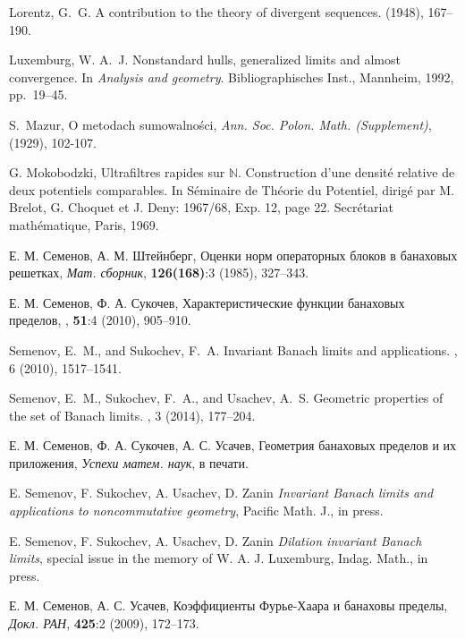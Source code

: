 \documentclass[12pt]{article}
\def\N{{\mathbb{N}}}
\begin{document}
\begin{thebibliography}{10}
{\sc Lorentz, G.~G.}
\newblock A contribution to the theory of divergent sequences.
 (1948), 167--190.

{\sc Luxemburg, W. A.~J.}
\newblock Nonstandard hulls, generalized limits and almost convergence.
\newblock In {\em Analysis and geometry}. Bibliographisches Inst., Mannheim,
  1992, pp.~19--45.

S.~Mazur,
\newblock O metodach sumowalno{\'{s}}ci,
\newblock \textit{Ann. Soc. Polon.
  Math. (Supplement)}, (1929), 102-107.

G. Mokobodzki, Ultrafiltres rapides sur $\N$. Construction d'une densit\'e relative de deux
potentiels comparables. In S\'eminaire de Th\'eorie du Potentiel, dirig\'e par M. Brelot, G.
Choquet et J. Deny: 1967/68, Exp. 12, page 22. Secr\'etariat math\'ematique, Paris, 1969.

{ Е. М. Семенов, А. М. Штейнберг},
{Оценки норм операторных блоков в банаховых решетках},
\newblock \textit{ Мат. сборник}, \textbf{126(168)}:3 (1985), 327--343.

{ Е. М. Семенов, Ф. А. Сукочев},
{ Характеристические функции банаховых пределов},
, \textbf{51}:4 (2010), 905--910.

{\sc Semenov, E.~M., and Sukochev, F.~A.}
\newblock Invariant {B}anach limits and applications.
, 6 (2010), 1517--1541.

{\sc Semenov, E.~M., Sukochev, F.~A., and Usachev, A.~S.}
\newblock Geometric properties of the set of {B}anach limits.
, 3 (2014), 177--204.

{ Е. М. Семенов, Ф. А. Сукочев, А. С. Усачев},
{Геометрия банаховых пределов и их приложения},
\newblock \textit{Успехи матем. наук}, в печати.

 E. Semenov, F. Sukochev, A. Usachev, D. Zanin \textit{Invariant Banach limits and applications to noncommutative geometry}, Pacific Math. J., in press.

 E. Semenov, F. Sukochev, A. Usachev, D. Zanin \textit{Dilation invariant Banach limits}, special issue in the memory of W. A. J. Luxemburg, Indag. Math., in press.

{ Е. М. Семенов, А. С. Усачев},
{Коэффициенты Фурье-Хаара и банаховы пределы},
\newblock \textit{ Докл. РАН}, \textbf{425}:2 (2009), 172--173.


\end{thebibliography}
\end{document}
